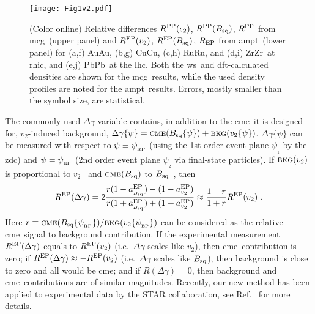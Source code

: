\documentclass[3p,times,procedia]{elsarticle}
\newcommand {\rhic}	{{\sc rhic}}
\newcommand {\lhc}	{{\sc lhc}}
\newcommand {\dft}	{{\sc dft}}
\newcommand {\ampt}	{{\sc ampt}}
\newcommand {\mcg}	{{\sc mcg}}
\newcommand {\ws}	{{\sc ws}}
\newcommand {\cme}	{{\mbox{\sc cme}}}
\newcommand {\psiRP}	{\psi_{_{\rm RP}}}
\newcommand {\psiPP}	{\psi_{_{\rm PP}}}
\newcommand {\psiEP}	{\psi_{_{\rm EP}}}
\newcommand {\etwo}	{\epsilon_2}
\newcommand {\vv}	{v_2}
\newcommand {\vEP}	{\vv\{\psiEP\}}
\newcommand {\vpsi}	{\vv\{\psi\}}
\newcommand {\CuCu}	{CuCu}
\newcommand {\PbPb}	{PbPb}
\newcommand {\RuRu}	{RuRu}
\newcommand {\ZrZr}	{ZrZr}
\newcommand {\AuAu}	{AuAu}
\newcommand {\bkg}	{{\mbox{\sc bkg}}}
\newcommand {\zdc}	{{\sc zdc}}
\newcommand {\rcme}	{r}
\newcommand {\psione}	{\psi_{_{1}}}
\newcommand {\av}	{a_{\vv}^{\rm EP}}
\newcommand {\aB}	{a_{_{\Bsq}}}
\newcommand {\aBEP}	{\aB^{\rm EP}}
\newcommand {\RPP}	{R^{\rm PP}}
\newcommand {\REP}	{R^{\rm EP}}
\newcommand {\rEP}	{R_{\rm EP}}
\newcommand {\Bsq}	{B_{\rm sq}}
\newcommand {\Bpsi}	{\Bsq\{\psi\}}
\newcommand {\BRP}	{\Bsq\{\psiRP\}}
\newcommand {\psitwo}	{\psi_{_{2}}}
\newcommand {\dg}	{\Delta\gamma}
\newcommand {\dgpsi}	{\dg\{\psi\}}
\newcommand {\dgRP}	{\dg\{\psiRP\}}
\newcommand {\dgPP}	{\dg\{\psiPP\}}
\begin{document}
\begin{figure*}
  \begin{center}
    \texttt{[image: Fig1v2.pdf]}
  \vspace{-0.2in}
  \caption{\label{fig}(Color online) Relative differences $\RPP(\etwo)$, $\RPP(\Bsq)$, $\RPP$ from \mcg\ (upper panel) and $\REP(\vv)$, $\REP(\Bsq)$, $\rEP$ from \ampt\ (lower panel) for (a,f) \AuAu, (b,g) \CuCu, (c,h) \RuRu, and (d,i) \ZrZr\ at \rhic, and (e,j) \PbPb\ at the \lhc. Both the \ws\ and \dft-calculated densities are shown for the \mcg\ results, while the used density profiles are noted for the \ampt\ results. Errors, mostly smaller than the symbol size, are statistical.}
  \end{center}
\end{figure*}

The commonly used $\dg$ variable contains, in addition to the \cme\ it is designed for, $\vv$-induced background, %
$\dgpsi=\cme(\Bpsi)+\bkg(\vpsi)$.
$\dgpsi$ can be measured with respect to $\psi=\psiRP$ (using the 1st order event plane $\psione$ by the \zdc) and $\psi=\psiEP$ (2nd order event plane $\psitwo$ via final-state particles). 
If $\bkg(\vv)$ is proportional to $\vv$~ and $\cme(\Bsq)$ to $\Bsq$~, then 
\begin{equation}
\REP(\dg)=2\frac{r(1-\aBEP)-(1-\av)}{r(1+\aBEP)+(1+\av)}\approx\frac{1-r}{1+r}\REP(\vv)\;.
\end{equation}
Here $\rcme\equiv\cme(\BRP)/\bkg(\vEP)$ can be considered as 
the relative \cme\ signal to background contribution.
If the experimental measurement $\REP(\dg)$ equals to $\REP(\vv)$ (i.e.~$\dg$ scales like $\vv$), then \cme\ contribution is zero; if $\REP(\dg)\approx-\REP(\vv)$ (i.e.~$\dg$ scales like $\Bsq$), then background is close to zero and all would be \cme; and if $R(\dg)=0$, then background and \cme\ contributions are of similar magnitudes.
Recently, our new method has been  applied to experimental data by the STAR collaboration, see Ref.~\cite{Zhao:2018en} for more details.
\end{document}
